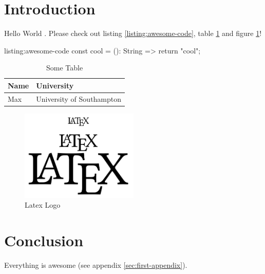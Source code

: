 \documentclass[12pt,a4paper]{article} %
\begin{document}

\newpage
\tableofcontents


\newpage
\section{Introduction}\label{sec:introduction}

Hello World \cite{React}.
Please check out listing \ref{listing:awesome-code}, table \ref{tab:mytable} and figure \ref{fig:latex-logo}!

\begin{code}{listing:awesome-code}
const cool = (): String => {
	return "cool";
}
\end{code}

\begin{table}[h!]
	\begin{tabularx}{\textwidth}{|l|X|}
		\hline
		\textbf{Name} & \textbf{University} \\
		\hline
		Max & University of Southampton \\
		\hline
	\end{tabularx}
	\caption{Some Table}
	\label{tab:mytable}
\end{table}

\begin{figure}[h!]
	\centering
	\includegraphics[width=0.5\textwidth]{latex.png}
	\caption{Latex Logo}
	\label{fig:latex-logo}
\end{figure}

\newpage
\section{Conclusion}\label{sec:conclusion}
Everything is awesome (see appendix \ref{sec:first-appendix}).
\end{document}
